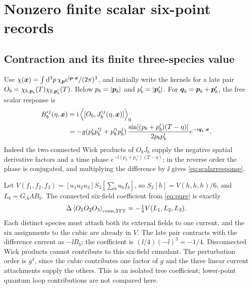 \section{Nonzero finite scalar six-point records}\label{sec:six}

\subsection{Contraction and its finite three-species value}
Use \(\chi(\boldsymbol x)=\int \mathrm{d}^3p\,\chi_{\boldsymbol p}e^{\mathrm{i}\boldsymbol p\cdot\boldsymbol x}/(2\pi)^3\), and initially write the kernels for a late pair \(O_b=\chi_{b,\boldsymbol p_b}(T)\chi_{b,\boldsymbol p'_b}(T)\). Below \(p_b=|\boldsymbol p_b|\) and \(p_b'=|\boldsymbol p_b'|\). For \(\boldsymbol q_b=\boldsymbol p_b+\boldsymbol p_b'\), the free scalar response is
\begin{align}
 B_b^{ij}(\eta,\boldsymbol x)
 &=\mathrm{i}\left\langle [O_b,J_b^{ij}(\eta,\boldsymbol x)]\right\rangle_0 \notag\\
 &=-g(p_b^ip_b'^j+p_b'^ip_b^j)\,
   \frac{\sin[(p_b+p_b')(T-\eta)]}{2p_bp_b'}e^{-\mathrm{i}\boldsymbol q_b\cdot\boldsymbol x}.
 \label{eq:scalarresponse}
\end{align}
Indeed the two connected Wick products of \(O_b J_b\) supply the negative spatial derivative factors and a time phase \(e^{-\ii(p_b+p_b')(T-\eta)}\); in the reverse order the phase is conjugated, and multiplying the difference by \(\ii\) gives \eqref{eq:scalarresponse}.

Let \(V(f_1,f_2,f_3)=[u_1u_2u_3]S_3[\sum_bu_bf_b]\), so \(S_3[h]=V(h,h,h)/6\), and \(L_b=G_A\Lambda B_b\). The connected six-field coefficient from \eqref{eq:pure} is exactly
\begin{equation}
 \Delta \left\langle O_1O_2O_3\right\rangle_{\mathrm{conn},3\mathrm{TT}}
 =-\tfrac14 V(L_1,L_2,L_3).
 \label{eq:trivar}
\end{equation}
Each distinct species must attach both its external fields to one current, and the six assignments to the cubic are already in \(V\). The late pair contracts with the difference current as \(-\ii B_b\); the coefficient is \((\ii/4)(-\ii)^3=-1/4\). Disconnected Wick products cannot contribute to this six-field cumulant. The perturbation order is \(g^4\), since the cubic contributes one factor of \(g\) and the three linear current attachments supply the others. This is an isolated tree coefficient; lower-point quantum loop contributions are not compared here.

